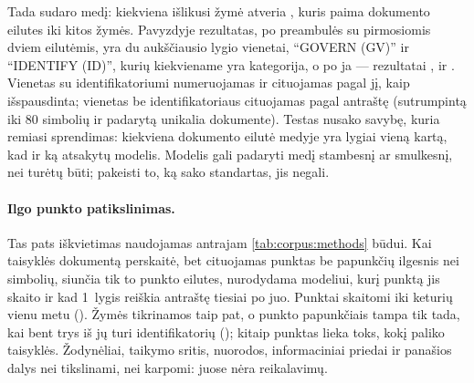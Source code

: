 Tada  sudaro medį: kiekviena išlikusi žymė atveria , kuris paima
dokumento eilutes iki kitos žymės. Pavyzdyje rezultatas, po preambulės su pirmosiomis dviem
eilutėmis, yra du aukščiausio lygio vienetai, \enquote{GOVERN (GV)} ir \enquote{IDENTIFY (ID)},
kurių kiekviename yra kategorija, o po ja --- rezultatai ,  ir
. Vienetas su identifikatoriumi numeruojamas ir cituojamas pagal jį, kaip
išspausdinta; vienetas be identifikatoriaus cituojamas pagal antraštę (sutrumpintą iki 80
simbolių ir padarytą unikalia dokumente). Testas
 nusako savybę, kuria remiasi
sprendimas: kiekviena dokumento eilutė medyje yra lygiai vieną kartą, kad ir ką atsakytų
modelis. Modelis gali padaryti medį stambesnį ar smulkesnį, nei turėtų būti; pakeisti to, ką
sako standartas, jis negali.

\paragraph{Ilgo punkto patikslinimas.} Tas pats iškvietimas naudojamas antrajam
\cref{tab:corpus:methods} būdui. Kai taisyklės dokumentą perskaitė, bet cituojamas punktas be
papunkčių ilgesnis nei  simbolių,  siunčia tik
to punkto eilutes, nurodydama modeliui, kurį punktą jis skaito ir kad 1~lygis reiškia antraštę
tiesiai po juo. Punktai skaitomi iki keturių vienu metu (). Žymės tikrinamos
taip pat, o punkto papunkčiais tampa tik tada, kai bent trys iš jų turi identifikatorių
(); kitaip punktas lieka toks, kokį paliko taisyklės. Žodynėliai, taikymo
sritis, nuorodos, informaciniai priedai ir panašios dalys nei tikslinami, nei karpomi: juose nėra
reikalavimų.

